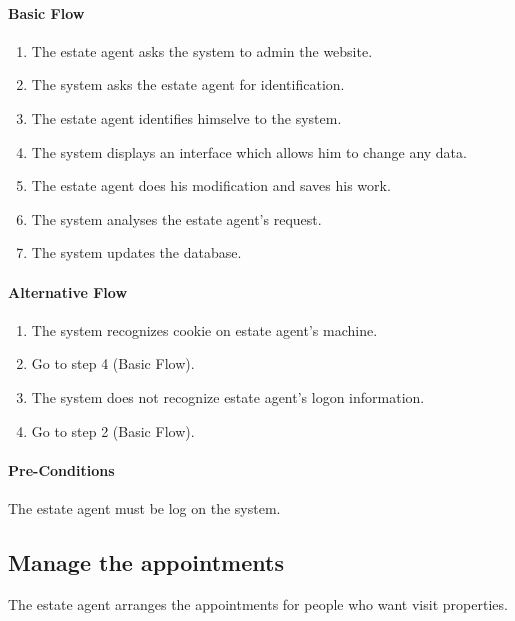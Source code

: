 \documentclass[a4paper,12pt]{article}
\begin{document}
\paragraph{Basic Flow}
\begin{enumerate}
\item The estate agent asks the system to admin the website.
\item The system asks the estate agent for identification.
\item The estate agent identifies himselve to the system.
\item The system displays an interface which allows him to change any data.
\item The estate agent does his modification and saves his work.
\item The system analyses the estate agent's request.
\item The system updates the database.
\end{enumerate}
\paragraph{Alternative Flow}
\begin{enumerate}
\item The system recognizes cookie on estate agent's machine. 
\item Go to step 4 (Basic Flow).
\item The system does not recognize estate agent's logon information.
\item Go to step 2 (Basic Flow).
\end{enumerate}
\paragraph{Pre-Conditions}
The estate agent must be log on the system.

\subsection{Manage the appointments}
The estate agent arranges the appointments for people who want visit properties.
\end{document}
